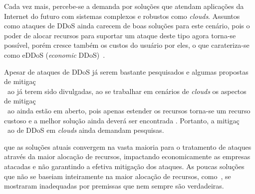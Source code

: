 \documentclass[a4paper, 11pt]{article}
\begin{document}




Cada vez mais, percebe-se a demanda por solu\c{c}\~oes que atendam
aplica\c{c}\~oes da Internet do futuro com sistemas complexos e robustos como
\emph{clouds}. Assuntos como ataques de DDoS ainda carecem de boas
solu\c{c}\~oes para este cen\'ario, pois o poder de
alocar recursos para suportar um ataque deste tipo agora torna-se
poss\'ivel, por\'em cresce tamb\'em os custos do usu\'ario por eles, o que
carateriza-se como eDDoS (\emph{economic} DDoS)~\cite{Soon:10}.
  
Apesar de ataques de DDoS j\'a serem bastante pesquisados e algumas propostas
de mitiga\c{c}\\~ao j\'a terem sido divulgadas, ao se trabalhar em cen\'arios de
\emph{clouds} os aspectos de mitiga\c{c}\\~ao ainda est\~ao em aberto, pois
apenas estender os recursos torna-se um recurso custoso e a melhor
solu\c{c}\~ao ainda dever\'a ser encontrada . Portanto, a mitiga\c{c}\\~ao de
DDoS em \emph{clouds} ainda demandam pesquisas.


que as soluções atuais convergem na vasta maioria para o tratamento de ataques
através da maior alocação de recursos, impactando economicamente as empresas
atacadas e não garantindo a efetiva mitigação dos ataques. As poucas soluções
que não se baseiam inteiramente na maior alocação de recursos,
como~\cite{Soon:10}, se mostraram inadequadas por premissas que nem sempre são
verdadeiras.
\end{document}
